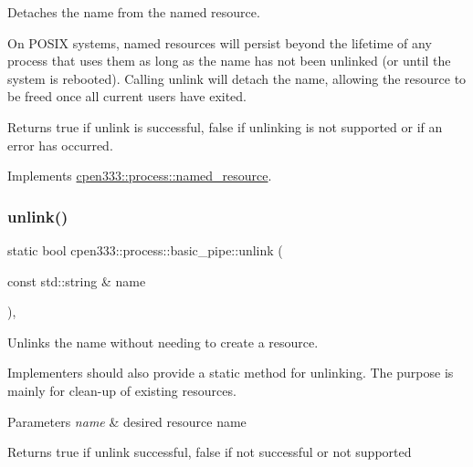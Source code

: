 Detaches the name from the named resource. 

On P\+O\+S\+IX systems, named resources will persist beyond the lifetime of any process that uses them as long as the name has not been unlinked (or until the system is rebooted). Calling {\ttfamily unlink} will detach the name, allowing the resource to be freed once all current users have exited.

\begin{DoxyReturn}{Returns}
{\ttfamily true} if unlink is successful, {\ttfamily false} if unlinking is not supported or if an error has occurred. 
\end{DoxyReturn}


Implements \hyperlink{classcpen333_1_1process_1_1named__resource_a5d33168fee48c9b0c58ab8fd96e230ce}{cpen333\+::process\+::named\+\_\+resource}.

\mbox{\label{classcpen333_1_1process_1_1basic__pipe_afef75c200701b049e58942210f0d6030}} 
\subsubsection{\texorpdfstring{unlink()}{unlink()}\hspace{0.1cm}{\footnotesize\ttfamily [2/2]}}
{\footnotesize\ttfamily static bool cpen333\+::process\+::basic\+\_\+pipe\+::unlink (\begin{DoxyParamCaption}\item[{const std\+::string \&}]{name }\end{DoxyParamCaption})\hspace{0.3cm}{\ttfamily [inline]}, {\ttfamily [static]}}



Unlinks the name without needing to create a resource. 

Implementers should also provide a static method for unlinking. The purpose is mainly for clean-\/up of existing resources.


\begin{DoxyParams}{Parameters}
{\em name} & desired resource name \\
\hline
\end{DoxyParams}
\begin{DoxyReturn}{Returns}
{\ttfamily true} if unlink successful, {\ttfamily false} if not successful or not supported 
\end{DoxyReturn}
\mbox{\label{classcpen333_1_1process_1_1basic__pipe_a969c7f9d0069b13e8fd3c50d98cb94a5}} 
